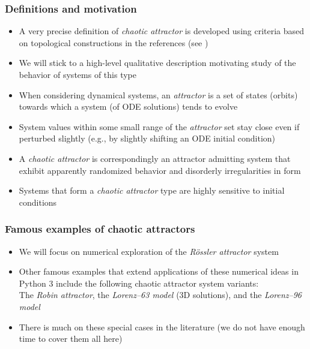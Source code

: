 \documentclass[usenames,svgnames,dvipsnames,10pt]{beamer}
\begin{document}
\begin{frame}
\frametitle{Definitions and motivation}

\begin{itemize} 

\item A very precise definition of \emph{chaotic attractor} is developed using criteria based on 
      topological constructions in the references (see \cite{CATTR-SURVEY,CHAOS-BOOK})
\item We will stick to a high-level qualitative description motivating study of the behavior of systems of this type 
\item When considering dynamical systems, an \emph{attractor} is a set of states (orbits) towards which a system (of ODE solutions) 
      tends to evolve
\item System values within some small range of the \emph{attractor} set stay close even if perturbed slightly 
      (e.g., by slightly shifting an ODE initial condition) 
\item A \emph{chaotic attractor} is correspondingly an attractor admitting system that exhibit apparently randomized behavior and 
      disorderly irregularities in form 
\item Systems that form a \emph{chaotic attractor} type are highly sensitive to initial conditions 

\end{itemize} 

\end{frame}

\begin{frame}
\frametitle{Famous examples of chaotic attractors}

\begin{itemize} 

\item We will focus on numerical exploration of the \emph{R\"ossler attractor} system 
\item Other famous examples that extend applications of these numerical ideas in Python 3 
      include the following chaotic attractor system variants: \\ 
      The \emph{Robin attractor}, the \emph{Lorenz--63 model} (3D solutions), and 
      the \emph{Lorenz--96 model}
\item There is much on these special cases in the literature (we do not have enough time to cover them all here) 

\end{itemize} 

\end{frame}
\end{document}
